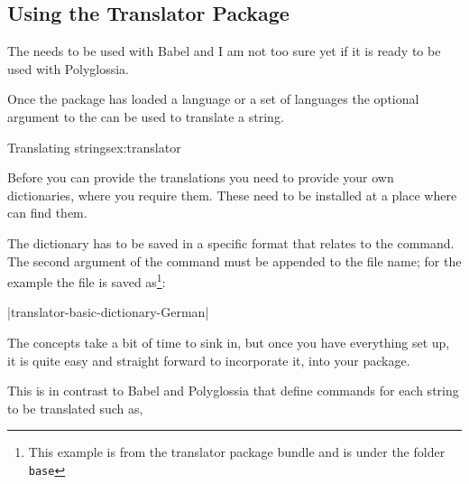 \subsection{Using the Translator Package}

  The  needs to be used with Babel and I am not too sure yet 
  if it is ready  to be used with Polyglossia.

Once the package has loaded a language or a set of languages the optional argument to the
\cmd{\translate} can be used to translate a string. 

\begin{texexample}{Translating strings}{ex:translator}
\end{texexample}

Before you can provide the translations you need to provide your own dictionaries, where you require them. These need to be installed at a place where \tex can find them.

\CMDI{\ProvidesDictionary}

The dictionary has to be saved in a specific format that relates to the \cmd{\ProvidesDictionary} command. The second argument of the command must be appended to the file name; for the example the file is saved as\footnote{This  example is from the translator package bundle and is under the folder \texttt{base}}:

|translator-basic-dictionary-German|

The concepts take a bit of time to sink in, but once you have everything set up, it is quite easy and straight forward to incorporate it, into your package. 

\begin{teXXX}

\end{teXXX} 

This is in contrast to Babel and Polyglossia that define
commands for each string to be translated such as,

